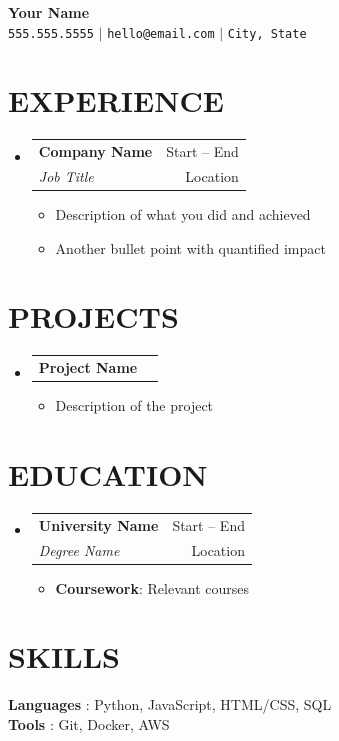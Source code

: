 \documentclass[letterpaper,11pt]{article}
\makeatletter
\newcommand{\resumeItem}[1]{
  \item\small{
    {#1 \vspace{-1pt}}
  }
}
\newcommand{\resumeSubheading}[4]{
  \vspace{-1pt}\item
    \begin{tabular*}{\textwidth}[t]{l@{\extracolsep{\fill}}r}
      \textbf{#1} & {\color{dark-grey}\small #2}\vspace{1pt}\\
      \textit{#3} & {\color{dark-grey} \small #4}\\
    \end{tabular*}\vspace{-4pt}
}
\newcommand{\resumeProjectHeading}[2]{
    \item
    \begin{tabular*}{\textwidth}{l@{\extracolsep{\fill}}r}
      #1 & {\color{dark-grey}} \\
    \end{tabular*}\vspace{-4pt}
}
\newcommand{\resumeSubHeadingListStart}{\begin{itemize}[leftmargin=0in, label={}]}
\newcommand{\resumeSubHeadingListEnd}{\end{itemize}}
\newcommand{\resumeItemListStart}{\begin{itemize}}
\newcommand{\resumeItemListEnd}{\end{itemize}\vspace{0pt}}
\makeatother
\begin{document}
\begin{center}
    \textbf{\Huge Your Name} \\ \vspace{5pt}
    \small \texttt{555.555.5555} \quad $|$
    \quad \texttt{hello@email.com} \quad $|$
    \quad \texttt{City, State}
    \\ \vspace{-3pt}
\end{center}

\section{EXPERIENCE}
  \resumeSubHeadingListStart

    \resumeSubheading
      {Company Name}{Start -- End}
      {Job Title}{Location}
      \resumeItemListStart
        \resumeItem{Description of what you did and achieved}
        \resumeItem{Another bullet point with quantified impact}
      \resumeItemListEnd

  \resumeSubHeadingListEnd


\section{PROJECTS}
    \resumeSubHeadingListStart
      \resumeProjectHeading
          {\textbf{Project Name}}{Date}
          \resumeItemListStart
            \resumeItem{Description of the project}
          \resumeItemListEnd
    \resumeSubHeadingListEnd


\section {EDUCATION}
  \resumeSubHeadingListStart
    \resumeSubheading
      {University Name}{Start -- End}
      {Degree Name}{Location}
      \resumeItemListStart
        \resumeItem {\textbf{Coursework}: Relevant courses}
      \resumeItemListEnd
  \resumeSubHeadingListEnd


\section{SKILLS}
 \begin{itemize}[leftmargin=0in, label={}]
    \small{\item{
     \textbf{Languages} {: Python, JavaScript, HTML/CSS, SQL}\vspace{2pt} \\
     \textbf{Tools}     {: Git, Docker, AWS}
    }}
 \end{itemize}


\end{document}
